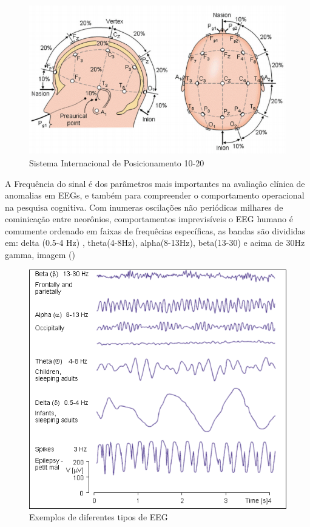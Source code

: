 \begin{figure}[h]
	\centering
	\includegraphics[scale=0.75]{figuras/padrao1020.png}
	\caption{Sistema Internacional de Posicionamento 10-20 }
	\label{padrao1020}
\end{figure}


A Frequência do sinal é dos parâmetros mais importantes na avaliação 
clínica de anomalias  em EEGs, e também para compreender o comportamento 
operacional na pesquisa cognitiva.
Com inumeras oscilações não periódicas milhares de cominicação entre 
neorônios, comportamentos imprevisíveis o EEG humano é comumente ordenado
 em faixas de frequêcias específicas, as bandas são divididas em: delta
 (0.5-4 Hz) , theta(4-8Hz), alpha(8-13Hz), beta(13-30) e acima de 30Hz gamma, imagem ()

\begin{figure}[h]
	\centering
	\includegraphics[keepaspectratio=true,scale=0.75]{figuras/formas_EEG.png}
	\caption{Exemplos de diferentes tipos de EEG}
	\label{EEGcomun}
\end{figure}





